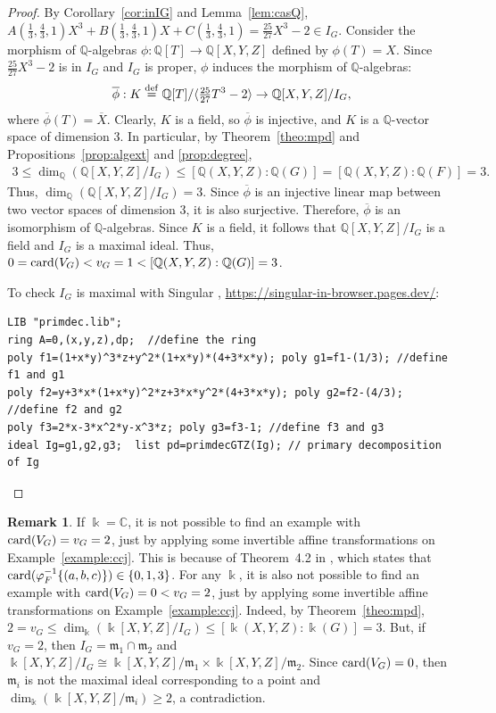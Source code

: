 \documentclass[11pt,reqno]{amsart}
\theoremstyle{definition}
\newtheorem{remark}[theorem]{Remark}
\newcommand{\mbk}{\mbox{$\Bbbk$}}
\newcommand{\mbc}{\mbox{$\mathbb{C}$}}
\newcommand{\mbq}{\mbox{$\mathbb{Q}$}}
\newcommand{\mfm}{\mbox{$\mathfrak{m}$}}
\newcommand{\card}{\mbox{${\rm card}$}}
\begin{document}
\begin{proof}
By Corollary~\ref{cor:inIG} and Lemma~\ref{lem:casQ}, 
$A(\tfrac{1}{3},\tfrac{4}{3},1)X^3+B(\tfrac{1}{3},\tfrac{4}{3},1)X+C(\tfrac{1}{3},\tfrac{4}{3},1)=
\frac{25}{27}X^3-2\in I_G$. Consider the morphism of $\mbq$-algebras $\phi:\mbq[T]\to\mbq[X,Y,Z]$ defined by $\phi(T)=X$. Since $\tfrac{25}{27}X^3-2$ is in $I_G$ and $I_G$ is proper, $\phi$ induces
the morphism of $\mbq$-algebras:
\begin{eqnarray*}
\overline{\phi}:K\stackrel{\rm def}{=}\mbq[T]/\langle\tfrac{25}{27}T^3-2\rangle\to 
\mbq[X,Y,Z]/I_G,
\end{eqnarray*}
where $\overline{\phi}(T)=\overline{X}$. Clearly, $K$ is a field, so $\overline{\phi}$ is injective, and $K$ is a $\mbq$-vector space of dimension 3. In particular, by Theorem~\ref{theo:mpd} and
Propositions~\ref{prop:algext} and \ref{prop:degree}, 
\begin{eqnarray*}
3\leq \dim_{\mathbb{Q}}(\mbq[X,Y,Z]/I_G)\leq [\mbq(X,Y,Z):\mbq(G)]=[\mbq(X,Y,Z):\mbq(F)]=3.
\end{eqnarray*}
Thus, $\dim_{\mathbb{Q}}(\mbq[X,Y,Z]/I_G)=3$. Since $\overline{\phi}$ is an injective linear map between two vector spaces of dimension $3$, it is also surjective. Therefore, $\overline{\phi}$ is an isomorphism of $\mbq$-algebras. Since $K$ is a field, it follows that $\mbq[X,Y,Z]/I_G$ is a field and $I_G$ is a maximal ideal. Thus, $0=\card(V_G)<v_G=1<[\mbq(X,Y,Z):\mbq(G)]=3$.

To check $I_G$ is maximal with {\sc Singular} \cite{dgps}, \url{https://singular-in-browser.pages.dev/}:
\begin{verbatim}
LIB "primdec.lib";
ring A=0,(x,y,z),dp;  //define the ring
poly f1=(1+x*y)^3*z+y^2*(1+x*y)*(4+3*x*y); poly g1=f1-(1/3); //define f1 and g1
poly f2=y+3*x*(1+x*y)^2*z+3*x*y^2*(4+3*x*y); poly g2=f2-(4/3); //define f2 and g2
poly f3=2*x-3*x^2*y-x^3*z; poly g3=f3-1; //define f3 and g3
ideal Ig=g1,g2,g3;  list pd=primdecGTZ(Ig); // primary decomposition of Ig
\end{verbatim}
\end{proof}

\begin{remark}\label{rem:final}
If $\mbk=\mbc$, it is not possible to find an example with $\card(V_G)=v_G=2$, just by
applying some invertible affine transformations on Example~\ref{example:ccj}. This is because of
Theorem~4.2 in \cite{ai}, which states that $\card(\varphi_F^{-1}\{(a,b,c)\})\in\{0,1,3\}$.
For any $\mbk$, it is also not possible to find an example with $\card(V_G)=0<v_G=2$,
just by applying some invertible affine transformations on Example~\ref{example:ccj}. Indeed, 
by Theorem~\ref{theo:mpd}, $2=v_G\leq \dim_{\Bbbk}(\mbk[X,Y,Z]/I_G)\leq [\mbk(X,Y,Z):\mbk(G)]=3$. But, if $v_G=2$, then $I_G=\mfm_1\cap \mfm_2$ and $\mbk[X,Y,Z]/I_G\cong \mbk[X,Y,Z]/\mfm_1\times \mbk[X,Y,Z]/\mfm_2$. Since $\card(V_G)=0$, then $\mfm_i$ is not the maximal ideal corresponding to a point and $\dim_{\Bbbk}(\mbk[X,Y,Z]/\mfm_i)\geq 2$, a contradiction. 
\end{remark}
\end{document}
